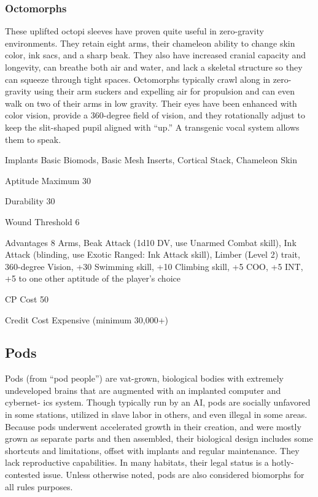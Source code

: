 \subsubsection{Octomorphs}
\label{sec:starting-octomorphs}

These uplifted octopi sleeves have proven quite useful in zero-gravity environments. They retain eight arms, their chameleon ability to change skin color, ink sacs, and a sharp beak. They also have increased cranial capacity and longevity, can breathe both air and water, and lack a skeletal structure so they can squeeze through tight spaces. Octomorphs typically crawl along in zero-gravity using their arm suckers and expelling air for propulsion and can even walk on two of their arms in low gravity. Their eyes have been enhanced with color vision, provide a 360-degree field of vision, and they rotationally adjust to keep the slit-shaped pupil aligned with “up.” A transgenic vocal system allows them to speak.

\begin{description*}
\item[Implants] Basic Biomods, Basic Mesh Inserts, Cortical Stack, Chameleon Skin
\item[Aptitude Maximum] 30 
\item[Durability] 30 
\item[Wound Threshold] 6 
\item[Advantages] 8 Arms, Beak Attack (1d10 DV, use Unarmed Combat skill), Ink Attack (blinding, use Exotic Ranged: Ink Attack skill), Limber (Level 2) trait, 360-degree Vision, +30 Swimming skill, +10 Climbing skill, +5 COO, +5 INT, +5 to one other aptitude of the player’s choice
\item[CP Cost] 50 
\item[Credit Cost] Expensive (minimum 30,000+) 
\end{description*}

\subsection{Pods}
\label{sec:starting-pods}

Pods (from “pod people”) are vat-grown, biological bodies with extremely undeveloped brains that are augmented with an implanted computer and cybernet- ics system. Though typically run by an AI, pods are socially unfavored in some stations, utilized in slave labor in others, and even illegal in some areas. Because pods underwent accelerated growth in their creation, and were mostly grown as separate parts and then assembled, their biological design includes some shortcuts and limitations, offset with implants and regular maintenance. They lack reproductive capabilities. In many habitats, their legal status is a hotly-contested issue. Unless otherwise noted, pods are also considered biomorphs for all rules purposes.


